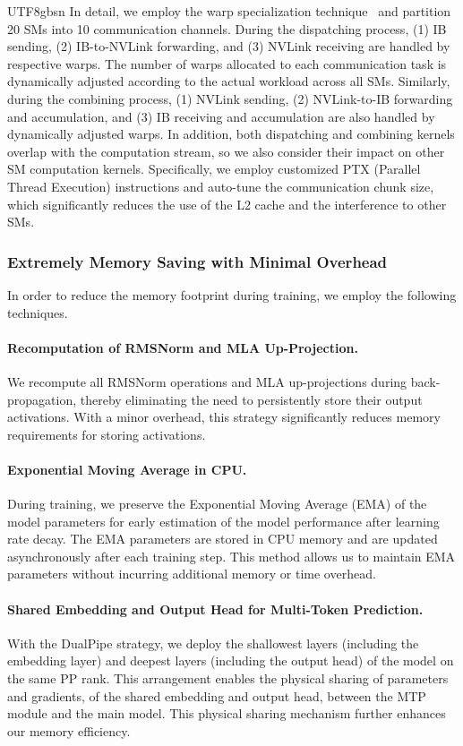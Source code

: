 \documentclass[11pt, a4paper, logo, copyright, nonumbering]{deepseek}
\begin{document}
\begin{CJK*}{UTF8}{gbsn}
In detail, we employ the warp specialization technique~\citep{warp-spec} and partition 20 SMs into 10 communication channels.
During the dispatching process, (1) IB sending, (2) IB-to-NVLink forwarding, and (3) NVLink receiving are handled by respective warps. 
The number of warps allocated to each communication task is dynamically adjusted according to the actual workload across all SMs. 
Similarly, during the combining process, (1) NVLink sending, (2) NVLink-to-IB forwarding and accumulation, and (3) IB receiving and accumulation are also handled by dynamically adjusted warps. 
In addition, both dispatching and combining kernels overlap with the computation stream, so we also consider their impact on other SM computation kernels. 
Specifically, we employ customized PTX (Parallel Thread Execution) instructions and auto-tune the communication chunk size, which significantly reduces the use of the L2 cache and the interference to other SMs. 

\subsubsection{Extremely Memory Saving with Minimal Overhead}

In order to reduce the memory footprint during training, we employ the following techniques.

\paragraph{Recomputation of RMSNorm and MLA Up-Projection.}

We recompute all RMSNorm operations and MLA up-projections during back-propagation, thereby eliminating the need to persistently store their output activations.
With a minor overhead, this strategy significantly reduces memory requirements for storing activations. 

\paragraph{Exponential Moving Average in CPU.}
During training, we preserve the Exponential Moving Average (EMA) of the model parameters for early estimation of the model performance after learning rate decay.
The EMA parameters are stored in CPU memory and are updated asynchronously after each training step. 
This method allows us to maintain EMA parameters without incurring additional memory or time overhead.

\paragraph{Shared Embedding and Output Head for Multi-Token Prediction.}
With the DualPipe strategy, we deploy the shallowest layers (including the embedding layer) and deepest layers (including the output head) of the model on the same PP rank. 
This arrangement enables the physical sharing of parameters and gradients, of the shared embedding and output head, between the MTP module and the main model.
This physical sharing mechanism further enhances our memory efficiency. 


\end{CJK*}
\end{document}
